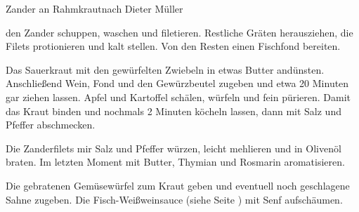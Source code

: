 \begin{recipe}{Zander an Rahmkraut}{nach Dieter Müller}



  \steps
  den Zander schuppen, waschen und filetieren. Restliche Gräten herausziehen, die Filets
  protionieren und kalt stellen. Von den Resten einen Fischfond bereiten.

  Das Sauerkraut mit den gewürfelten Zwiebeln in etwas Butter andünsten. Anschließend
  Wein, Fond und den Gewürzbeutel zugeben und etwa 20 Minuten gar ziehen lassen. Apfel und
  Kartoffel schälen, würfeln und fein pürieren. Damit das Kraut binden und nochmals 2
  Minuten köcheln lassen, dann mit Salz und Pfeffer abschmecken.

  Die Zanderfilets mir Salz und Pfeffer würzen, leicht mehlieren und in Olivenöl braten.
  Im letzten Moment mit Butter, Thymian und Rosmarin aromatisieren.

  Die gebratenen Gemüsewürfel zum Kraut geben und eventuell noch geschlagene Sahne
  zugeben. Die Fisch-Weißweinsauce (siehe Seite \pageref{Fischsauce}) mit Senf aufschäumen.
\end{recipe}
